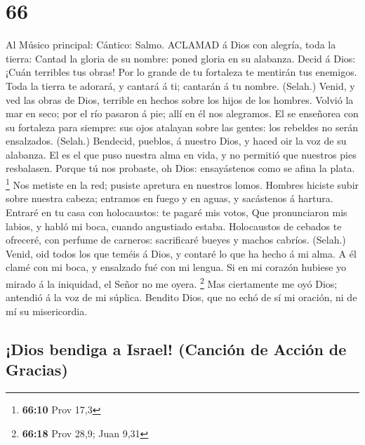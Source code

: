 \hypertarget{section-65}{%
\section{66}\label{section-65}}

 Al Músico principal: Cántico: Salmo. ACLAMAD á Dios con
alegría, toda la tierra:  Cantad la gloria de su nombre:
poned gloria en su alabanza.  Decid á Dios: ¡Cuán terribles
tus obras! Por lo grande de tu fortaleza te mentirán tus enemigos.
 Toda la tierra te adorará, y cantará á ti; cantarán á tu
nombre. (Selah.)  Venid, y ved las obras de Dios, terrible
en hechos sobre los hijos de los hombres.  Volvió la mar en
seco; por el río pasaron á pie; allí en él nos alegramos. 
El se enseñorea con su fortaleza para siempre: sus ojos atalayan sobre
las gentes: los rebeldes no serán ensalzados. (Selah.) 
Bendecid, pueblos, á nuestro Dios, y haced oir la voz de su alabanza.
 El es el que puso nuestra alma en vida, y no permitió que
nuestros pies resbalasen.  Porque tú nos probaste, oh Dios:
ensayástenos como se afina la plata. \footnote{\textbf{66:10} Prov 17,3}
 Nos metiste en la red; pusiste apretura en nuestros lomos.
 Hombres hiciste subir sobre nuestra cabeza; entramos en
fuego y en aguas, y sacástenos á hartura.  Entraré en tu
casa con holocaustos: te pagaré mis votos,  Que
pronunciaron mis labios, y habló mi boca, cuando angustiado estaba.
 Holocaustos de cebados te ofreceré, con perfume de
carneros: sacrificaré bueyes y machos cabríos. (Selah.) 
Venid, oid todos los que teméis á Dios, y contaré lo que ha hecho á mi
alma.  A él clamé con mi boca, y ensalzado fué con mi
lengua.  Si en mi corazón hubiese yo mirado á la iniquidad,
el Señor no me oyera. \footnote{\textbf{66:18} Prov 28,9; Juan 9,31}
 Mas ciertamente me oyó Dios; antendió á la voz de mi
súplica.  Bendito Dios, que no echó de sí mi oración, ni de
mí su misericordia.

\hypertarget{dios-bendiga-a-israel-canciuxf3n-de-acciuxf3n-de-gracias}{%
\subsection{¡Dios bendiga a Israel! (Canción de Acción de
Gracias)}\label{dios-bendiga-a-israel-canciuxf3n-de-acciuxf3n-de-gracias}}


